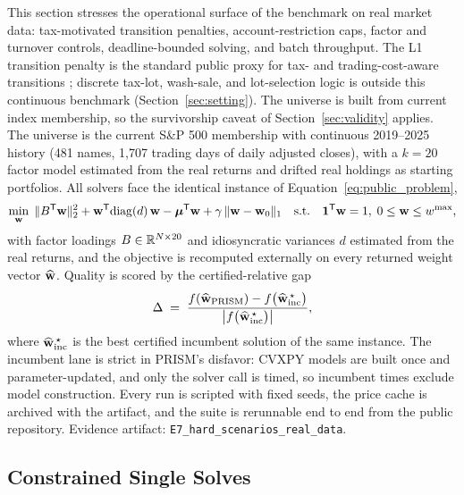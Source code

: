 \documentclass[10pt,a4paper]{extarticle}
\begin{document}
This section stresses the operational surface of the benchmark on real market
data: tax-motivated transition penalties, account-restriction caps, factor and
turnover controls, deadline-bounded solving, and batch throughput. The L1
transition penalty is the standard public proxy for tax- and
trading-cost-aware transitions \citep{moehle2021taxaware,fan2025costaware};
discrete tax-lot, wash-sale, and lot-selection logic is outside this
continuous benchmark (Section~\ref{sec:setting}). The universe is built from
current index membership, so the survivorship caveat of
Section~\ref{sec:validity} applies. The universe is the
current S\&P 500 membership with continuous 2019--2025 history (481 names,
1{,}707 trading days of daily adjusted closes), with a $k{=}20$ factor model
estimated from the real returns and drifted real holdings as starting
portfolios. All solvers face the identical instance of
Equation~\eqref{eq:public_problem},
\[
  \min_{\mathbf{w}}\;
  \|B^{\mathsf{T}}\mathbf{w}\|_2^2 + \mathbf{w}^{\mathsf{T}}\!\operatorname{diag}(d)\,\mathbf{w}
  - \boldsymbol{\mu}^{\mathsf{T}}\mathbf{w} + \gamma\,\|\mathbf{w} - \mathbf{w}_0\|_1
  \quad \text{s.t.} \quad
  \mathbf{1}^{\mathsf{T}}\mathbf{w} = 1,\; 0 \leq \mathbf{w} \leq w^{\max},
\]
with factor loadings $B \in \mathbb{R}^{N\times 20}$ and idiosyncratic variances
$d$ estimated from the real returns, and the objective is recomputed
externally on every returned weight vector $\widehat{\mathbf{w}}$. Quality is
scored by the certified-relative gap
\[
  \Delta \;=\;
  \frac{f(\widehat{\mathbf{w}}_{\mathrm{PRISM}})
        - f\big(\widehat{\mathbf{w}}^{\,\star}_{\mathrm{inc}}\big)}
       {\big|f\big(\widehat{\mathbf{w}}^{\,\star}_{\mathrm{inc}}\big)\big|},
\]
where $\widehat{\mathbf{w}}^{\,\star}_{\mathrm{inc}}$ is the best certified
incumbent solution of the same instance. The incumbent lane is strict in PRISM's
disfavor: CVXPY models are built once and parameter-updated, and only the
solver call is timed, so incumbent times exclude model construction. Every
run is scripted with fixed seeds, the price cache is archived with the
artifact, and the suite is rerunnable end to end from the public repository.
Evidence artifact: \texttt{E7\_hard\_scenarios\_real\_data}.

\subsection{Constrained Single Solves}
\end{document}
